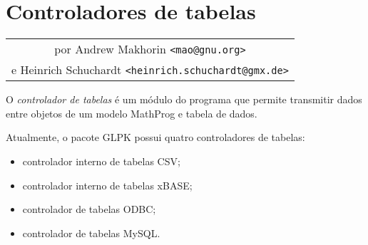 \documentclass[11pt, brazil]{report}
\begin{document}
%
%
%
%



\chapter{Controladores de tabelas}
\label{drivers}

\noindent\hfil
\begin{tabular}{c}
por Andrew Makhorin \verb|<mao@gnu.org>|\\
e Heinrich Schuchardt \verb|<heinrich.schuchardt@gmx.de>|\\
\end{tabular}

\bigskip\bigskip

O {\it controlador de tabelas} é um módulo do programa que permite transmitir
dados entre objetos de um modelo MathProg e tabela de dados.

Atualmente, o pacote GLPK possui quatro controladores de tabelas:

\vspace*{-8pt}

\begin{itemize}
\item controlador interno de tabelas CSV;
\item controlador interno de tabelas xBASE;
\item controlador de tabelas ODBC;
\item controlador de tabelas MySQL.
\end{itemize}
\end{document}
